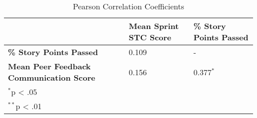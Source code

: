 \begin{table}
    \caption{Pearson Correlation Coefficients}
    \begin{center}
         \label{tbl:pearson}
        \begin{tabular}{|p{} | p{} | p{}|} 
            \hline &\textbf{Mean Sprint STC Score}&\textbf{\% Story Points Passed}
            \\ \hline
            \textbf{\% Story Points Passed} & 0.109 & -
            \\ \hline
            \textbf{Mean Peer Feedback Communication Score} & 0.156 & 0.377$^{*}$
            \\ \hline
            \multicolumn{3}{l}{$^{*}$p < .05}
            \\ \multicolumn{3}{l}{$^{**}$p < .01}
        \end{tabular}
    \end{center}
\end{table}